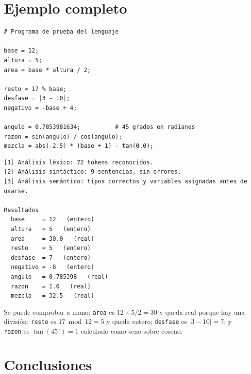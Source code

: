\documentclass[12pt,letterpaper]{article}
\newcommand{\tk}[1]{\texttt{#1}}
\begin{document}
\section{Ejemplo completo}

\noindent\begin{minipage}{\linewidth}
\begin{lstlisting}[caption={\texttt{ejemplos/demo.lp}.}]
# Programa de prueba del lenguaje

base = 12;
altura = 5;
area = base * altura / 2;

resto = 17 % base;
desfase = |3 - 10|;
negativo = -base + 4;

angulo = 0.7853981634;          # 45 grados en radianes
razon = sin(angulo) / cos(angulo);
mezcla = abs(-2.5) * (base + 1) - tan(0.0);
\end{lstlisting}
\end{minipage}

\noindent\begin{minipage}{\linewidth}
\begin{lstlisting}[caption={Salida de \texttt{python3 main.py ejemplos/demo.lp}.}]
[1] Análisis léxico: 72 tokens reconocidos.
[2] Análisis sintáctico: 9 sentencias, sin errores.
[3] Análisis semántico: tipos correctos y variables asignadas antes de usarse.

Resultados
  base     = 12   (entero)
  altura   = 5   (entero)
  area     = 30.0   (real)
  resto    = 5   (entero)
  desfase  = 7   (entero)
  negativo = -8   (entero)
  angulo   = 0.785398   (real)
  razon    = 1.0   (real)
  mezcla   = 32.5   (real)
\end{lstlisting}
\end{minipage}

Se puede comprobar a mano: \tk{area} es $12 \times 5 / 2 = 30$ y queda real porque hay una división; \tk{resto} es $17 \bmod 12 = 5$ y queda entero; \tk{desfase} es $|3-10| = 7$; y \tk{razon} es $\tan(45^\circ) = 1$ calculado como seno sobre coseno.

\section{Conclusiones}
\end{document}
